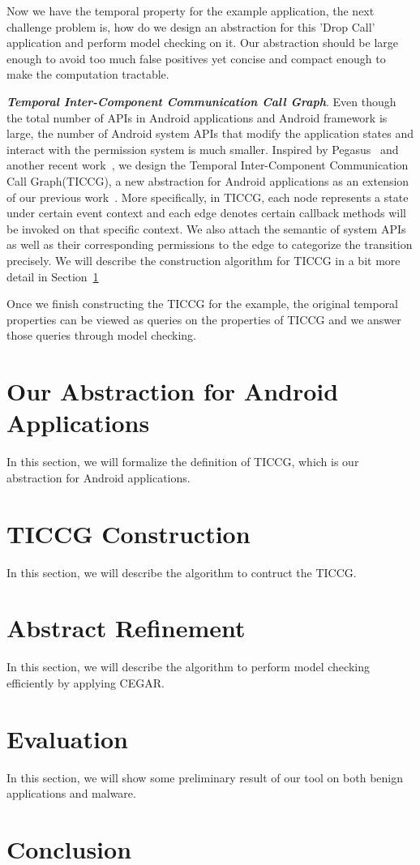 \documentclass{article}
\begin{document}
Now we have the temporal property for the example application, the next 
challenge problem is, how do we design an abstraction for this 'Drop Call' 
application and perform model checking on it. Our abstraction should be large
enough to avoid too much false positives yet concise and compact enough 
to make the computation tractable.


{\bf \emph{Temporal Inter-Component Communication Call Graph}}. Even though
the total number of APIs in Android applications and Android framework is large,
the number of Android system APIs that modify the application states and 
interact with the permission system is much smaller. Inspired by Pegasus~\cite{pegasus} 
and another recent work~\cite{aware14}, we design the Temporal Inter-Component
 Communication Call Graph(TICCG), a new abstraction for 
Android applications as an extension of our previous work~\cite{apposcopy}.
More specifically, in TICCG, each node represents a state under certain
event context and each edge denotes certain callback methods will be invoked 
on that specific context. We also attach the semantic of system APIs 
as well as their corresponding permissions to the edge to categorize 
the transition precisely. We will describe the construction algorithm for 
TICCG in a bit more detail in Section~\ref{sec:ticcg} 

Once we finish constructing the TICCG for the example, the original temporal
properties can be viewed as queries on the properties of TICCG and we answer those
queries through model checking.  

\section{Our Abstraction for Android Applications}
\label{sec:ticcg}
In this section, we will formalize the definition of TICCG, which is our abstraction
for Android applications.

\section{TICCG Construction}
\label{sec:construct}
In this section, we will describe the algorithm to contruct the TICCG.

\section{Abstract Refinement}
\label{sec:cegar}
In this section, we will describe the algorithm to perform model checking efficiently
by applying CEGAR.

\section{Evaluation}
\label{sec:eval}
In this section, we will show some preliminary result of our tool on both benign
applications and malware. 

\section{Conclusion}
\label{sec:conclude}


%
%


 
\end{document}
